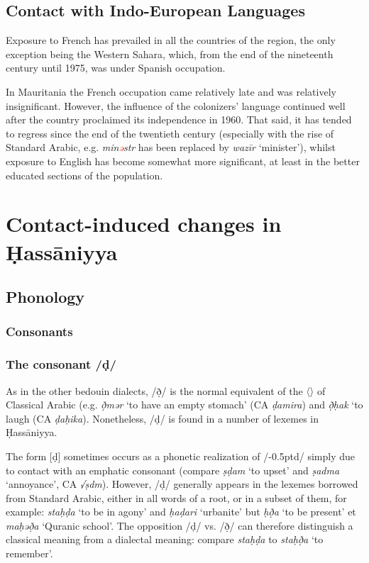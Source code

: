 \documentclass[output=paper]{langsci/langscibook}
\begin{document}
\subsection{ Contact with Indo-European Languages} %

Exposure to French has prevailed in all the countries of the region, the only exception being the Western Sahara, which, from the end of the nineteenth century until 1975, was under Spanish occupation.

In Mauritania the French occupation came relatively late and was relatively insignificant. However, the influence of the colonizers’ language continued well after the country proclaimed its independence in 1960. That said, it has tended to regress since the end of the twentieth century (especially with the rise of Standard Arabic, e.g. \textit{min\textcolor{red}{ə}str} has been replaced by \textit{wazīr} ‘minister’), whilst exposure to English has become somewhat more significant, at least in the better educated sections of the population.

\section{Contact-induced changes in  Ḥassāniyya} %

\subsection{ Phonology} %

\subsubsection{ Consonants} %
\subsubsection{The consonant /ḍ/} %
As in the other bedouin dialects, /ð̣/ is the normal equivalent of the 〈{}〉 of Classical Arabic (e.g. \textit{ð̣mər} ‘to have an empty stomach’ (CA \textit{ḍamira}) and \textit{ð̣ḥak} ‘to laugh (CA \textit{ḍaḥika}). Nonetheless, /ḍ/ is found in a number of lexemes in Ḥassāniyya. 

The form [ḍ] sometimes occurs as a phonetic realization of /\kern -0.5ptd/ simply due to contact with an emphatic consonant (compare \textit{ṣḍam} ‘to upset’ and \textit{ṣadma} ‘annoyance’, CA \textit{√ṣdm}). However, /ḍ/ generally appears in the lexemes borrowed from Standard Arabic, either in all words of a root, or in a subset of them, for example: \textit{staḥḍa{\R}} ‘to be in agony’ and \textit{ḥaḍari} ‘urbanite’ but \textit{ḥð̣a{\R}} ‘to be present’ et \textit{maḥəð̣{\R}a} ‘Quranic school’. The opposition /ḍ/ vs. /ð̣/ can therefore distinguish a classical meaning from a dialectal meaning: compare \textit{staḥḍa{\R}} to \textit{staḥð̣a{\R}} ‘to remember’.
\end{document}
